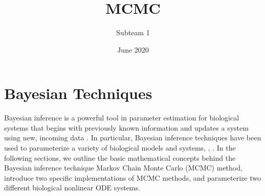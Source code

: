 \documentclass{article}
\title{MCMC}
\author{Subteam 1}
\date{June 2020}
\begin{document}
\maketitle

\section{Bayesian Techniques} \label{Bayesian_Techniques}
Bayesian inference is a powerful tool in parameter estimation for biological systems that begins with previously known information and updates a system using new, incoming data \cite{bayesian_param_inf}.  In particular, Bayesian inference techniques have been used to parameterize a variety of biological models and systems, \cite{bayesian_param_inf_ex1}, \cite{bayesian_param_inf_ex2}. In the following sections, we outline the basic mathematical concepts behind the Bayesian inference technique Markov Chain Monte Carlo (MCMC) method, introduce two specific implementations of MCMC methods, and parameterize two different biological nonlinear ODE systems.
\end{document}

